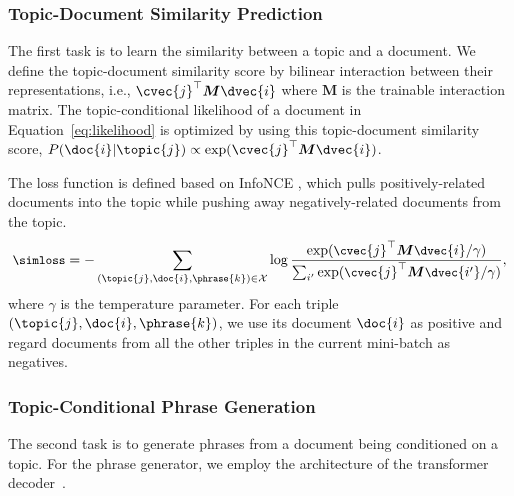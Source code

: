 \subsubsection{Topic-Document Similarity Prediction}
\label{subsubsec:prediction}
The first task is to learn the similarity between a topic and a document.
We define the topic-document similarity score by bilinear interaction between their representations, i.e., $\cvec{j}^\top \bm{M} \dvec{i}$ where $\bm{M}$ is the trainable interaction matrix.
The topic-conditional likelihood of a document in Equation~\eqref{eq:likelihood} is optimized by using this topic-document similarity score, $P(\doc{i}|\topic{j}) \propto \exp(\cvec{j}^\top \bm{M} \dvec{i})$.

The loss function is defined based on InfoNCE \cite{oord2018representation}, which pulls positively-related documents into the topic while pushing away negatively-related documents from the topic.
\begin{equation}
\small
\label{eq:simloss}
    \simloss = - \sum_{(\topic{j},\doc{i},\phrase{k})\in\mathcal{X}} \log \frac{\exp(\cvec{j}^\top\bm{M} \dvec{i}/\gamma)}{\sum_{i'}\exp(\cvec{j}^\top \bm{M} \dvec{i'}/\gamma)},
\end{equation}
where $\gamma$ is the temperature parameter.
For each triple $(\topic{j}, \doc{i}, \phrase{k})$, we use its document $\doc{i}$ as positive and regard documents from all the other triples in the current mini-batch as negatives.

\subsubsection{Topic-Conditional Phrase Generation}
\label{subsubsec:generation}
The second task is to generate phrases from a document being conditioned on a topic.
For the phrase generator, we employ the architecture of the transformer decoder~\cite{vaswani2017attention}.

